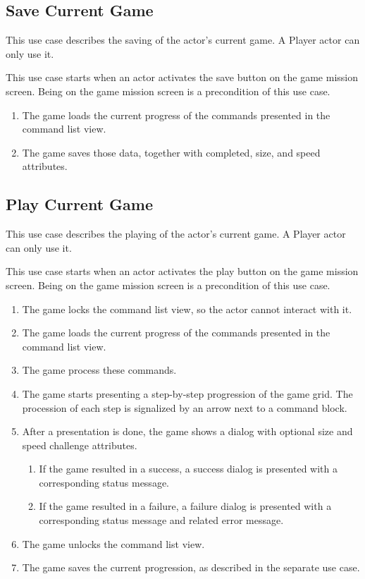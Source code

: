 \subsection{Save Current Game}

This use case describes the saving of the actor's current game.
A Player actor can only use it.

This use case starts when an actor activates the save button on the game mission screen.
Being on the game mission screen is a precondition of this use case.

\begin{enumerate}
    \item The game loads the current progress of the commands presented in the command list view.
    \item The game saves those data, together with completed, size, and speed attributes. 
\end{enumerate}

\subsection{Play Current Game}

This use case describes the playing of the actor's current game.
A Player actor can only use it.

This use case starts when an actor activates the play button on the game mission screen.
Being on the game mission screen is a precondition of this use case.

\begin{enumerate}
    \item The game locks the command list view, so the actor cannot interact with it. 
    \item The game loads the current progress of the commands presented in the command list view.
    \item The game process these commands.
    \item The game starts presenting a step-by-step progression of the game grid.
    The procession of each step is signalized by an arrow next to a command block.
    \item After a presentation is done, the game shows a dialog with optional size and speed challenge attributes.
    \begin{enumerate}
        \item If the game resulted in a success, a success dialog is presented with a corresponding status message.
        \item If the game resulted in a failure, a failure dialog is presented with a corresponding status message and related error message.
    \end{enumerate}
    \item The game unlocks the command list view.
    \item The game saves the current progression, as described in the separate use case. 
\end{enumerate}

